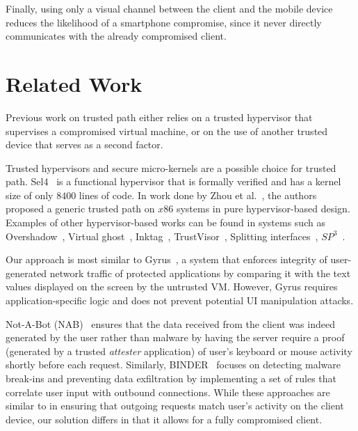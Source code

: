 Finally, using only a visual channel between the client and the mobile device reduces the likelihood of a smartphone compromise, since it never directly communicates with the already compromised client.

\section{Related Work} \label{sec:relatedWork}

Previous work on trusted path either relies on a trusted hypervisor that supervises a compromised virtual machine, or on the use of another trusted device that serves as a second factor.

Trusted hypervisors and secure micro-kernels are a possible choice for trusted path. Sel4~\cite{klein2009sel4} is a functional hypervisor that is formally verified and has a kernel size of only $8400$ lines of code. In work done by Zhou et al.~\cite{x86}, the authors proposed a generic trusted path on $x86$ systems in pure hypervisor-based design. Examples of other hypervisor-based works can be found in systems such as Overshadow~\cite{Overshadow}, Virtual ghost~\cite{criswell2014virtual}, Inktag~\cite{hofmann2013inktag}, TrustVisor~\cite{mccune2010trustvisor}, Splitting interfaces~\cite{ta2006splitting}, $SP^3$~\cite{yang2008using}.

Our approach is most similar to Gyrus~\cite{gyrus}, a system that enforces integrity of user-generated network traffic of protected applications by comparing it with the text values displayed on the screen by the untrusted VM.
However, Gyrus requires application-specific logic and does not prevent potential UI manipulation attacks.

Not-A-Bot (NAB)~\cite{nab} ensures that the data received from the client was indeed generated by the user rather than malware by having the server require a proof (generated by a trusted \emph{attester} application) of user's keyboard or mouse activity shortly before each request.
Similarly, BINDER~\cite{binder} focuses on detecting malware break-ins and preventing data exfiltration by implementing a set of rules that correlate user input with outbound connections.
While these approaches are similar to \sysname in ensuring that outgoing requests match user's activity on the client device, our solution differs in that it allows for a fully compromised client.


